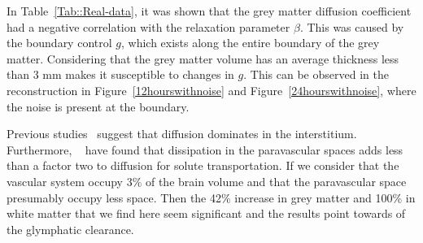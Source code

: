 \documentclass[12pt,a4paper]{article}
\begin{document}
In Table~\ref{Tab::Real-data}, it was shown that the grey matter diffusion coefficient had a negative correlation with the relaxation parameter $\beta$. This was caused by the boundary control $g$, which exists along the entire boundary of the grey matter. Considering that the grey matter volume has an average thickness less than 3 mm makes it susceptible to changes in $g$. This can be observed in the reconstruction in Figure~\ref{12hourswithnoise} and Figure~\ref{24hourswithnoise}, where the noise is present at the boundary.
  
Previous studies~\cite{holter2017interstitial, smith2017glymphatic} suggest that diffusion dominates in the interstitium. Furthermore, ~\cite{asgari2016glymphatic, brynjfm, Diem} have found that dissipation in the paravascular spaces adds less than a factor two
to diffusion for solute transportation. If we consider that the vascular system occupy 3\% of the brain volume
and that the paravascular space presumably occupy less space. Then the 42\% increase in grey matter and 100\% in white matter that we find here seem significant and the results point towards of the glymphatic clearance.  
%

 

\end{document}
